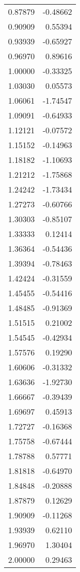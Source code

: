 \begin{longtable}[H]{rr}
0.87879 &        -0.48662 \\
0.90909 &         0.55394 \\
0.93939 &        -0.65927 \\
0.96970 &         0.89616 \\
1.00000 &        -0.33325 \\
1.03030 &         0.05573 \\
1.06061 &        -1.74547 \\
1.09091 &        -0.64933 \\
1.12121 &        -0.07572 \\
1.15152 &        -0.14963 \\
1.18182 &        -1.10693 \\
1.21212 &        -1.75868 \\
1.24242 &        -1.73434 \\
1.27273 &        -0.60766 \\
1.30303 &        -0.85107 \\
1.33333 &         0.12414 \\
1.36364 &        -0.54436 \\
1.39394 &        -0.78463 \\
1.42424 &        -0.31559 \\
1.45455 &        -0.54416 \\
1.48485 &        -0.91369 \\
1.51515 &         0.21002 \\
1.54545 &        -0.42934 \\
1.57576 &         0.19290 \\
1.60606 &        -0.31332 \\
1.63636 &        -1.92730 \\
1.66667 &        -0.39439 \\
1.69697 &         0.45913 \\
1.72727 &        -0.16368 \\
1.75758 &        -0.67444 \\
1.78788 &         0.57771 \\
1.81818 &        -0.64970 \\
1.84848 &        -0.20888 \\
1.87879 &         0.12629 \\
1.90909 &        -0.11268 \\
1.93939 &         0.62110 \\
1.96970 &         1.30404 \\
2.00000 &         0.29463 \\

\end{longtable}
